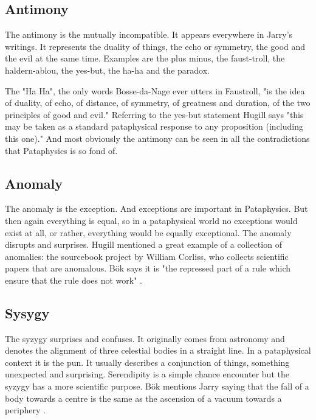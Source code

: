 \subsection{Antimony}

The antimony is the mutually incompatible. It appears everywhere in Jarry's writings. It represents the duality of things, the echo or symmetry, the good and the evil at the same time. Examples are the plus minus, the faust-troll, the haldern-ablou, the yes-but, the ha-ha and the paradox.

The "Ha Ha", the only words Bosse-da-Nage ever utters in Faustroll, "is the idea of duality, of echo, of distance, of symmetry, of greatness and duration, of the two principles of good and evil." \citep{Hugill2012} Referring to the yes-but statement Hugill says "this may be taken as a standard pataphysical response to any proposition (including this one)." And most obviously the antimony can be seen in all the contradictions that Pataphysics is so fond of.

\subsection{Anomaly}

The anomaly is the exception. And exceptions are important in Pataphysics. But then again everything is equal, so in a pataphysical world no exceptions would exist at all, or rather, everything would be equally exceptional. The anomaly disrupts and surprises. Hugill mentioned a great example of a collection of anomalies: the sourcebook project by William Corliss, who collects scientific papers that are anomalous. Bök says it is "the repressed part of a rule which ensure that the rule does not work" \citep[p.38]{Bok2002}.

\subsection{Sysygy}

The syzygy surprises and confuses. It originally comes from astronomy and denotes the alignment of three celestial bodies in a straight line. In a pataphysical context it is the pun. It usually describes a conjunction of things, something unexpected and surprising. Serendipity is a simple chance encounter but the syzygy has a more scientific purpose. Bök mentions Jarry saying that the fall of a body towards a centre is the same as the ascension of a vacuum towards a periphery \citep[p.42]{Bok2002}.

